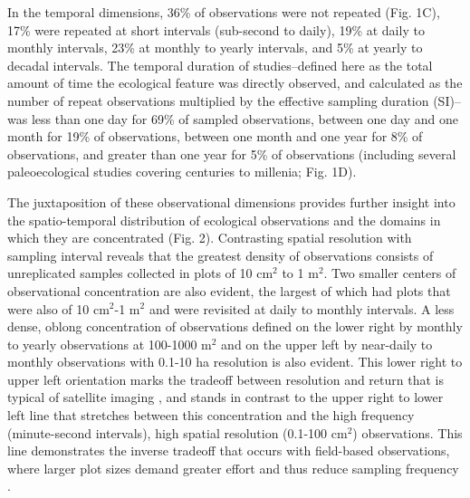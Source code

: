 \documentclass[12pt]{article}
\begin{document}
In the temporal dimensions, 36\% of observations were not repeated (Fig. 1C), 17\% were repeated at short intervals (sub-second to daily), 19\% at daily to monthly intervals, 23\% at monthly to yearly intervals, and 5\% at yearly to decadal intervals.  The temporal duration of studies--defined here as the total amount of time the ecological feature was directly observed, and calculated as the number of repeat observations multiplied by the effective sampling duration (SI)--was less than one day for 69\% of sampled observations, between one day and one month for 19\% of observations, between one month and one year for 8\% of observations, and greater than one year for 5\% of observations (including several paleoecological studies covering centuries to millenia; Fig. 1D).

The juxtaposition of these observational dimensions provides further insight into the spatio-temporal distribution of ecological observations and the domains in which they are concentrated (Fig. 2). Contrasting spatial resolution with sampling interval reveals that the greatest density of observations consists of unreplicated samples collected in plots of 10 cm$^2$ to 1 m$^2$. Two smaller centers of observational concentration are also evident, the largest of which had plots that were also of 10 cm$^2$-1 m$^2$ and were revisited at daily to monthly intervals. A less dense, oblong concentration of observations defined on the lower right by monthly to yearly observations at 100-1000 m$^2$ and on the upper left by near-daily to monthly observations with 0.1-10 ha resolution is also evident. This lower right to upper left orientation marks the tradeoff between resolution and return that is typical of satellite imaging \cite{estes_platform_2016}, and stands in contrast to the upper right to lower left line that stretches between this concentration and the high frequency (minute-second intervals), high spatial resolution (0.1-100 cm$^2$) observations. This line demonstrates the inverse tradeoff that occurs with field-based observations, where larger plot sizes demand greater effort and thus reduce sampling frequency \cite{kareiva_spatial_1988}.   

\end{document}

